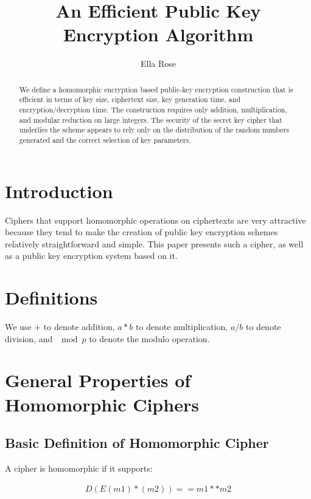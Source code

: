 \documentclass[preprint]{iacrtrans}
\author{Ella Rose}
\institute{Paso Robles, CA \email{python_pride@protonmail.com}}
\title[An Efficient Public Key Encryption Algorithm]{An Efficient Public Key Encryption Algorithm}
\begin{document}
\maketitle


\begin{abstract}
 We define a homomorphic encryption based public-key encryption construction that is efficient in terms of key size, ciphertext size, key generation time, and encryption/decryption time. The construction requires only addition, multiplication, and modular reduction on large integers. The security of the secret key cipher that underlies the scheme appears to rely only on the distribution of the random numbers generated and the correct selection of key parameters.
 \end{abstract}

\todototoc
\listoftodos


\section{Introduction}
 Ciphers that support homomorphic operations on ciphertexts are very attractive because they tend to make the creation of public key encryption schemes relatively straightforward and simple. This paper presents such a cipher, as well as a public key encryption system based on it.

\section{Definitions}
We use $+$ to denote addition, $a * b$ to denote multiplication, $a / b$ to denote division, and $\mod p$ to denote the modulo operation.

\section{General Properties of Homomorphic Ciphers}
\subsection{Basic Definition of Homomorphic Cipher}
A cipher is homomorphic if it supports:

\begin{align}
 D(E(m1) * (m2)) == m1 ** m2
\end{align}
\end{document}
